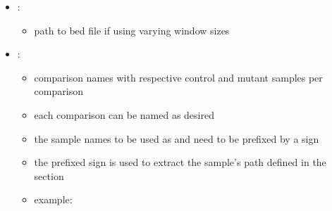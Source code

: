 \documentclass[letterpaper,10pt,english]{sphinxhowto}
\begin{document}
\begin{sphinxVerbatim}[commandchars=\\\{\}]
    
    
    
\end{sphinxVerbatim}
\begin{itemize}
\item {} 
:
\begin{itemize}
\item {} 
path to bed file if using varying window sizes

\end{itemize}

\item {} 
:
\begin{itemize}
\item {} 
comparison names with respective control and mutant samples per comparison

\item {} 
each comparison can be named as desired

\item {} 
the sample names to be used as  and  need to be prefixed by a \sphinxtitleref{*} sign

\item {} 
the \sphinxtitleref{*} prefixed sign is used to extract the sample’s path defined in the  section

\item {} 
example:

\end{itemize}

\end{itemize}
\end{document}
